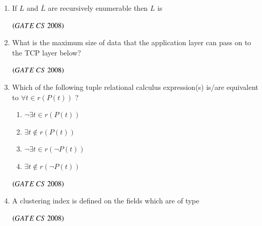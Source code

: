 \documentclass[journal]{IEEEtran}
\numberwithin{equation}{enumi}
\numberwithin{figure}{enumi}
\begin{document}
\begin{enumerate}
\item If $L$ and $\overline{L}$ are recursively enumerable then $L$ is
\begin{enumerate} 
\end{enumerate}
\hfill $\left(GATE\ CS\  2008\right)$

\item What is the maximum size of data that the application layer can pass on to the TCP layer below?
\begin{enumerate} 
\end{enumerate}
\hfill $\left(GATE\ CS\  2008\right)$

\item Which of the following tuple relational calculus expression(s) is/are equivalent to $\forall t \in r \left(P(t)\right)$ ?
\begin{enumerate} 
   \item $\neg \exists t \in r \left(P(t)\right)$
   \item $\exists t \notin r \left(P(t)\right)$
   \item $\neg \exists t \in r \left (\neg P(t)\right)$
   \item $ \exists t \notin r \left (\neg P(t)\right)$
\end{enumerate}
\begin{enumerate}
\end{enumerate}
\hfill $\left(GATE\ CS\  2008\right)$

\item A clustering index is defined on the fields which are of type
\begin{enumerate} 
\end{enumerate}
\hfill $\left(GATE\ CS\  2008\right)$


\end{enumerate}
\end{document}
